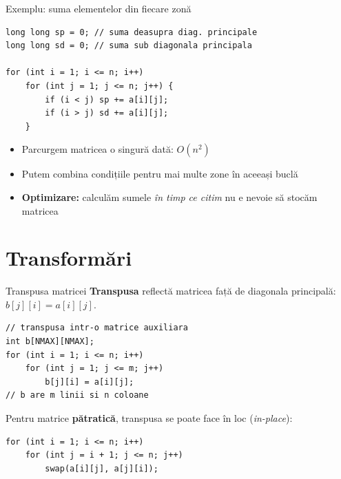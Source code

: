 \documentclass{beamer}
\begin{document}
\begin{frame}[fragile]{Exemplu: suma elementelor din fiecare zonă}
  \begin{lstlisting}
long long sp = 0; // suma deasupra diag. principale
long long sd = 0; // suma sub diagonala principala

for (int i = 1; i <= n; i++)
    for (int j = 1; j <= n; j++) {
        if (i < j) sp += a[i][j];
        if (i > j) sd += a[i][j];
    }
  \end{lstlisting}

  \begin{itemize}
    \item Parcurgem matricea o singură dată: $O(n^2)$
    \item Putem combina condițiile pentru mai multe zone în aceeași buclă
    \item \textbf{Optimizare:} calculăm sumele \emph{în timp ce citim} \textemdash{} nu e nevoie să stocăm matricea
  \end{itemize}
\end{frame}

\section{Transformări}

\begin{frame}[fragile]{Transpusa matricei}
  \textbf{Transpusa} reflectă matricea față de diagonala principală: $b[j][i] = a[i][j]$.

  \begin{lstlisting}
// transpusa intr-o matrice auxiliara
int b[NMAX][NMAX];
for (int i = 1; i <= n; i++)
    for (int j = 1; j <= m; j++)
        b[j][i] = a[i][j];
// b are m linii si n coloane
  \end{lstlisting}

  \smallskip
  Pentru matrice \textbf{pătratică}, transpusa se poate face în loc (\emph{in-place}):
  \begin{lstlisting}
for (int i = 1; i <= n; i++)
    for (int j = i + 1; j <= n; j++)
        swap(a[i][j], a[j][i]);
  \end{lstlisting}
\end{frame}
\end{document}
